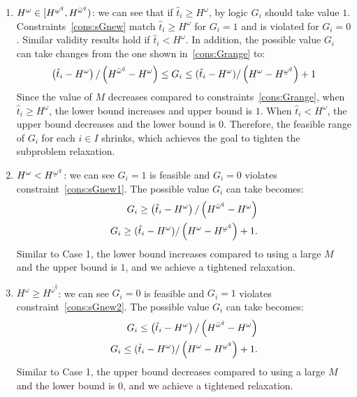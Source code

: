 \documentclass[11pt]{article}
\renewcommand{\underbar}{\underaccent{\bar}}
\begin{document}
	\begin{enumerate}
		\item 
			\(H^\omega \in [H^{\underbar{\omega}^{\hat{q}}},H^{\bar{\omega}^{\hat{q}}})\): we can see that if \(\hat{t}_i \geq H^\omega\), by logic \(G_i\) should take value \(1\). Constraints~\eqref{cons:sGnew} match \(\hat{t}_i \geq H^\omega\) for \(G_i = 1\) and is violated for \(G_i = 0\). Similar validity results hold if \(\hat{t}_i < H^\omega\). In addition, the possible value \(G_i\) can take changes from the one shown in~\eqref{cons:Grange} to:
			\begin{equation*}
			\left(\hat{t}_i - H^\omega \right)/\left( H^{\bar{\omega}^{\hat{q}}} - H^\omega \right) \leq G_i \leq (\hat{t}_i - H^\omega)/\left(H^\omega - H^{\underbar{\omega}^{\hat{q}}} \right) + 1
			\end{equation*}
			Since the value of \(M\) decreases compared to constraints~\eqref{cons:Grange}, when \(\hat{t}_i \geq H^\omega\), the lower bound increases and upper bound is \(1\). When \(\hat{t}_i < H^\omega\), the upper bound decreases and the lower bound is \(0\). Therefore, the feasible range of \(G_i\) for each \(i \in I\) shrinks, which achieves the goal to tighten the subproblem relaxation.
		\item 
			\(H^\omega < H^{\underbar{\omega}^{\hat{q}}}\): we can see \(G_i = 1\) is feasible and \(G_i = 0\) violates constraint~\eqref{cons:sGnew1}. The possible value \(G_i\) can take becomes:
			\begin{align*}
			G_i \geq \left(\hat{t}_i - H^\omega \right)/\left( H^{\bar{\omega}^{\hat{q}}} - H^\omega \right)\\
			G_i \geq (\hat{t}_i - H^\omega)/\left(H^\omega - H^{\underbar{\omega}^{\hat{q}}} \right) + 1.
			\end{align*}
			Similar to Case 1, the lower bound increases compared to using a large \(M\) and the upper bound is \(1\), and we achieve a tightened relaxation.
		\item 
			\(H^\omega \geq H^{\bar{\omega}^{\hat{q}}}\): we can see \(G_i = 0\) is feasible and \(G_i = 1\) violates constraint~\eqref{cons:sGnew2}. The possible value \(G_i\) can take becomes:
			\begin{align*}
			G_i \leq \left(\hat{t}_i - H^\omega \right)/\left( H^{\bar{\omega}^{\hat{q}}} - H^\omega \right)\\
			G_i \leq (\hat{t}_i - H^\omega)/\left(H^\omega - H^{\underbar{\omega}^{\hat{q}}} \right) + 1.
			\end{align*}
			Similar to Case 1, the upper bound decreases compared to using a large \(M\) and the lower bound is \(0\), and we achieve a tightened relaxation.
	\end{enumerate}
\end{document}
